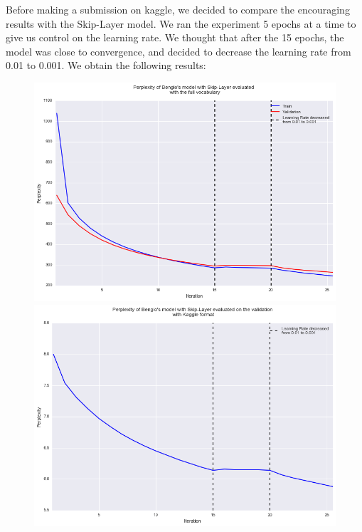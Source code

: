 \documentclass[11pt]{article}
\begin{document}
Before making a submission on kaggle, we decided to compare the encouraging results with the Skip-Layer model. We ran the experiment 5 epochs at a time to give us control on the learning rate. We thought that after the 15 epochs, the model was close to convergence, and decided to decrease the learning rate from 0.01 to 0.001. We obtain the following results:
\begin{figure}[H]
  \centering
  \begin{minipage}[b]{0.45\textwidth}
    \includegraphics[width=\textwidth]{skip_tr}
  \end{minipage}
  \hfill
  \begin{minipage}[b]{0.45\textwidth}
    \includegraphics[width=\textwidth]{skip_val}
  \end{minipage}
\end{figure}
\end{document}
